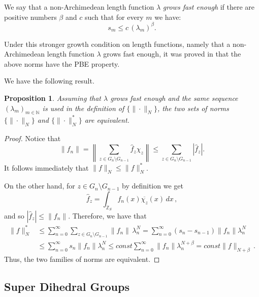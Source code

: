 \documentclass[12pt,reqno]{amsart}
\numberwithin{equation}{section}
\newcommand{\N}{{\mathbb N}}
\newcommand{\Z}{{\mathbb Z}}
\newtheorem{prop}[theo]{{\sc \bf Proposition}}
\begin{document}
We say that a non-Archimedean length function $\lambda$ {\it grows fast enough} if there are positive numbers $\beta$ and $c$ such that for every $m$ we have:
\begin{equation}\label{fast_enough}
s_m\leq c\,(\lambda_m)^\beta.
\end{equation}

Under this stronger growth condition on length functions, namely that a non-Archimedean length function $\lambda$ grows fast enough, it was proved in \cite{KM2} that the above norms have the PBE property.

We have the following result.
\begin{prop} Assuming that $\lambda$ grows fast enough and the same sequence $(\lambda_m)_{m\in\N}$ is used in the definition of $\{\|\cdot\|_N\}$, the two sets of norms $\{\|\cdot\|_N\}$ and  $\{\|\cdot\|^*_N\}$ are equivalent.
\end{prop}
\begin{proof}
Notice that
\begin{equation*}
\|f_n\|=\left\|\sum_{z\in G_n\setminus G_{n-1}}\hat f_z \chi_z\right\|\leq \sum_{z\in G_n\setminus G_{n-1}}|\hat f_z|.
\end{equation*}
It follows immediately that $\|f\|_N\le \|f\|_N^*$.  

On the other hand, for $z\in G_n\setminus G_{n-1}$ by definition we get
\begin{equation*}
\hat{f}_z = \int_{\Z_S}f_n(x)\overline{\chi_z}(x)\,dx\,,
\end{equation*}
and so $|\hat{f}_z|\le\|f_n\|$. Therefore, we have that
\begin{equation*}
\begin{aligned}
\|f\|_N^*&\le \sum_{n=0}^\infty\sum_{z\in G_n\setminus G_{n-1}}\|f_n\|\,\lambda_n^N = \sum_{n=0}^\infty(s_n-s_{n-1})\|f_n\|\lambda_n^N\\
&\le \sum_{n=0}^\infty s_n\|f_n\|\lambda_n^N \le const\sum_{n=0}^\infty\|f_n\|\lambda_n^{N+\beta} = const\|f\|_{N+\beta}\,.
\end{aligned}
\end{equation*}
Thus, the two families of norms are equivalent.

\end{proof}


\subsection{Super Dihedral Groups} 
\end{document}
